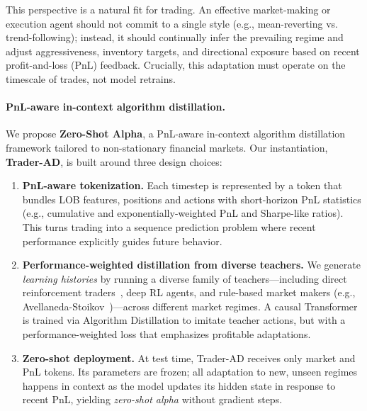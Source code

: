 \documentclass{article}
\begin{document}
This perspective is a natural fit for trading. An effective market-making or execution agent should not commit to a single style (e.g., mean-reverting vs. trend-following); instead, it should continually infer the prevailing regime and adjust aggressiveness, inventory targets, and directional exposure based on recent profit-and-loss (PnL) feedback. Crucially, this adaptation must operate on the timescale of trades, not model retrains.

\paragraph{PnL-aware in-context algorithm distillation.}
We propose \textbf{Zero-Shot Alpha}, a PnL-aware in-context algorithm distillation framework tailored to non-stationary financial markets. Our instantiation, \textbf{Trader-AD}, is built around three design choices:
\begin{enumerate}
    \item \textbf{PnL-aware tokenization.} Each timestep is represented by a token that bundles LOB features, positions and actions with short-horizon PnL statistics (e.g., cumulative and exponentially-weighted PnL and Sharpe-like ratios). This turns trading into a sequence prediction problem where recent performance explicitly guides future behavior.
    \item \textbf{Performance-weighted distillation from diverse teachers.} We generate \emph{learning histories} by running a diverse family of teachers---including direct reinforcement traders~\citep{moody2001direct}, deep RL agents, and rule-based market makers (e.g., Avellaneda-Stoikov~\citep{avellaneda2008high})---across different market regimes. A causal Transformer is trained via Algorithm Distillation to imitate teacher actions, but with a performance-weighted loss that emphasizes profitable adaptations.
    \item \textbf{Zero-shot deployment.} At test time, Trader-AD receives only market and PnL tokens. Its parameters are frozen; all adaptation to new, unseen regimes happens in context as the model updates its hidden state in response to recent PnL, yielding \emph{zero-shot alpha} without gradient steps.
\end{enumerate}
\end{document}
